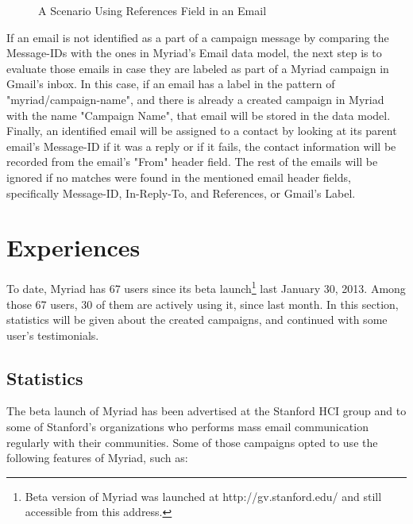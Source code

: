 \begin{figure}[htbp]
	\centering
	\begin{pdfpic}
	    
	\end{pdfpic}
	\caption[A Scenario Using References Field in an Email]{A Scenario Using References Field in an Email}
	\label{fig:drawingMessageReferences}
\end{figure}

If an email is not identified as a part of a campaign message by comparing the Message-IDs with the ones in Myriad's Email data model, the next step is to evaluate those emails in case they are labeled as part of a Myriad campaign in Gmail's inbox. In this case, if an email has a label in the pattern of "myriad/campaign-name", and there is already a created campaign in Myriad with the name "Campaign Name", that email will be stored in the data model. Finally, an identified email will be assigned to a contact by looking at its parent email's Message-ID if it was a reply or if it fails, the contact information will be recorded from the email's "From" header field. The rest of the emails will be ignored if no matches were found in the mentioned email header fields, specifically Message-ID, In-Reply-To, and References, or Gmail's Label.

\section{Experiences}
\label{sec:5.4:Expr}

To date, Myriad has 67 users since its beta launch\footnote{Beta version of Myriad was launched at http://gv.stanford.edu/ and still accessible from this address.} last January 30, 2013. Among those 67 users, 30 of them are actively using it, since last month. In this section, statistics will be given about the created campaigns, and continued with some user's testimonials.

\subsection{Statistics}
\label{subsec:5.4.1:Stat}

The beta launch of Myriad has been advertised at the Stanford \ac{HCI} group and to some of Stanford's organizations who performs mass email communication regularly with their communities. Some of those campaigns opted to use the following features of Myriad, such as:

